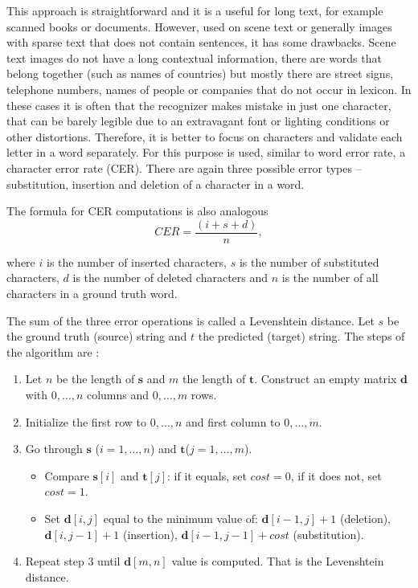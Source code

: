 This approach is straightforward and it is a useful for long text, for example scanned books or documents. However, used on scene text or generally images with sparse text that does  not contain sentences, it has some drawbacks. Scene text images do not have a long contextual information, there are words that belong together (such as names of countries) but mostly there are street signs, telephone numbers, names of people or companies that do not occur in lexicon. In these cases it is often that the recognizer makes mistake in just one character, that can be barely legible due to an extravagant font or lighting conditions or other distortions. Therefore, it is better to focus on characters and validate each letter in a word separately. For this purpose is used, similar to word error rate, a character error rate (CER). There are again three possible error types -- substitution, insertion and deletion of a character in a word.

The formula for CER computations is also analogous
\begin{equation}
    CER = \frac{(i + s + d)}{n},
\end{equation}

where $i$ is the number of inserted characters, $s$ is the number of substituted characters, $d$ is the number of deleted characters and $n$ is the number of all characters in a ground truth word.\cite{cersite}

The sum of the three error operations is called a Levenshtein distance. Let $s$ be the ground truth (source) string and $t$ the predicted (target) string. The steps of the  algorithm are \cite{cerpaper}:
\begin{enumerate}
    \item Let $n$ be the length of $\bm{s}$ and $m$ the length of $\bm{t}$. Construct an empty matrix $\bm{d}$ with $0,\dots, n$ columns and $0,\dots, m$ rows.
    \item Initialize the first row to $0,\dots, n$ and first column to $0,\dots, m$.
    \item Go through $\bm{s}$ ($i=1,\dots,n$) and $\bm{t}$($j=1,\dots, m$).
    \begin{itemize}
        \item Compare $\bm{s}[i]$ and $\bm{t}[j]$: 
        \subitem if it equals, set $cost = 0$,
        \subitem if it does not, set $cost = 1$.
        \item Set $\bm{d}[i,j]$ equal to the minimum value of:
        \subitem $\bm{d}[i-1,j]+1$ (deletion),
        \subitem $\bm{d}[i,j-1]+1$ (insertion),
        \subitem $\bm{d}[i-1,j-1]+cost$ (substitution).
    \end{itemize} 
    \item Repeat step 3 until $\bm{d}[m,n]$ value is computed. That is the Levenshtein distance.
\end{enumerate}

